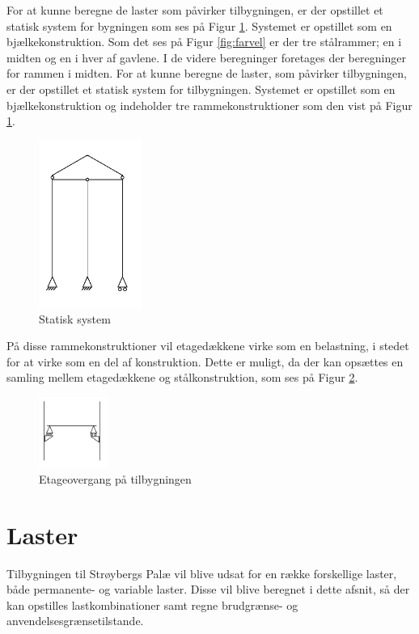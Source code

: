 For at kunne beregne de laster som påvirker tilbygningen, er der opstillet et statisk system for bygningen som ses på Figur \ref{fig:system}. Systemet er opstillet som en bjælkekonstruktion. Som det ses på Figur \ref{fig:farvel} er der tre stålrammer; en i midten og en i hver af gavlene. I de videre beregninger foretages der beregninger for rammen i midten.
\newline
\newline
For at kunne beregne de laster, som påvirker tilbygningen, er der opstillet et statisk system for tilbygningen. Systemet er opstillet som en bjælkekonstruktion og indeholder tre rammekonstruktioner som den vist på Figur \ref{fig:system}.

\begin{figure}[htbp]
	\centering
	\includegraphics[width=0.3\textwidth]{billeder/del1statiskesystem.png}
	\caption{Statisk system}
	\label{fig:system}
\end{figure}

På disse rammekonstruktioner vil etagedækkene virke som en belastning, i stedet for at virke som en del af konstruktion. Dette er muligt, da der kan opsættes en samling mellem etagedækkene og stålkonstruktion, som ses på Figur \ref{fig:etage}.

\begin{figure}[htbp]
	\centering
	\includegraphics[width=0.2\textwidth]{billeder/etageovergang.png}
	\caption{Etageovergang på tilbygningen}
	\label{fig:etage}
\end{figure}

\section{Laster}
Tilbygningen til Strøybergs Palæ vil blive udsat for en række forskellige laster, både permanente- og variable laster. Disse vil blive beregnet i dette afsnit, så der kan opstilles lastkombinationer samt regne brudgrænse- og anvendelsesgrænsetilstande.

